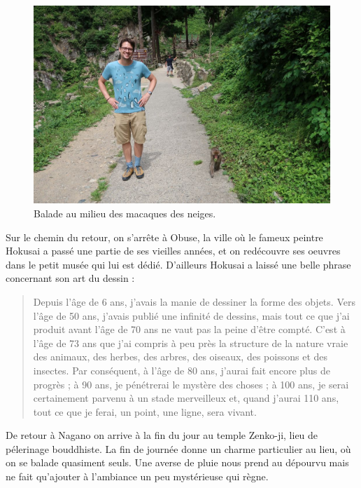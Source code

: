 \begin{figure}
\centering
\includegraphics{images/20180723_singes.JPG}
\caption{Balade au milieu des macaques des neiges.}
\end{figure}

Sur le chemin du retour, on s'arrête à Obuse, la ville où le fameux
peintre Hokusai a passé une partie de ses vieilles années, et on
redécouvre ses oeuvres dans le petit musée qui lui est dédié. D'ailleurs
Hokusai a laissé une belle phrase concernant son art du dessin :

\begin{quote}
Depuis l'âge de 6 ans, j'avais la manie de dessiner la forme des objets.
Vers l'âge de 50 ans, j'avais publié une infinité de dessins, mais tout
ce que j'ai produit avant l'âge de 70 ans ne vaut pas la peine d'être
compté. C'est à l'âge de 73 ans que j'ai compris à peu près la structure
de la nature vraie des animaux, des herbes, des arbres, des oiseaux, des
poissons et des insectes. Par conséquent, à l'âge de 80 ans, j'aurai
fait encore plus de progrès ; à 90 ans, je pénétrerai le mystère des
choses ; à 100 ans, je serai certainement parvenu à un stade merveilleux
et, quand j'aurai 110 ans, tout ce que je ferai, un point, une ligne,
sera vivant.
\end{quote}

De retour à Nagano on arrive à la fin du jour au temple Zenko-ji, lieu
de pélerinage bouddhiste. La fin de journée donne un charme particulier
au lieu, où on se balade quasiment seuls. Une averse de pluie nous prend
au dépourvu mais ne fait qu'ajouter à l'ambiance un peu mystérieuse qui
règne.


